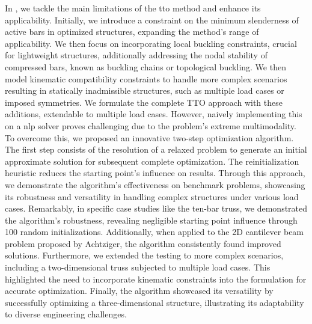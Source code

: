In , we tackle the main limitations of the \gls{tto} method and enhance its applicability. Initially, we introduce a constraint on the minimum slenderness of active bars in optimized structures, expanding the method's range of applicability. We then focus on incorporating local buckling constraints, crucial for lightweight structures, additionally addressing the nodal stability of compressed bars, known as buckling chains or topological buckling. We then model kinematic compatibility constraints to handle more complex scenarios resulting in statically inadmissible structures, such as multiple load cases or imposed symmetries. We formulate the complete TTO approach with these additions, extendable to multiple load cases. However, naively implementing this on a \gls{nlp} solver proves challenging due to the problem's extreme multimodality. To overcome this, we proposed an innovative two-step optimization algorithm. The first step consists of the resolution of a relaxed problem to generate an initial approximate solution for subsequent complete optimization. The reinitialization heuristic reduces the starting point's influence on results. Through this approach, we demonstrate the algorithm's effectiveness on benchmark problems, showcasing its robustness and versatility in handling complex structures under various load cases. Remarkably, in specific case studies like the ten-bar truss, we demonstrated the algorithm's robustness, revealing negligible starting point influence through 100 random initializations. Additionally, when applied to the 2D cantilever beam problem proposed by Achtziger, the algorithm consistently found improved solutions. Furthermore, we extended the testing to more complex scenarios, including a two-dimensional truss subjected to multiple load cases. This highlighted the need to incorporate kinematic constraints into the formulation for accurate optimization. Finally, the algorithm showcased its versatility by successfully optimizing a three-dimensional structure, illustrating its adaptability to diverse engineering challenges.

